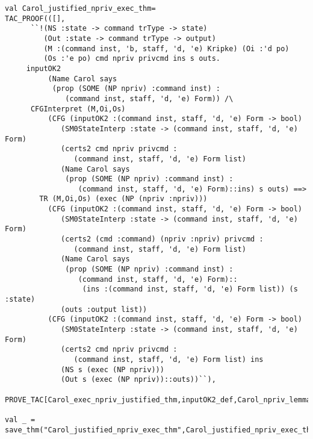 \documentclass{report}
\begin{document}
\begin{lstlisting}[frame=TBlr]
val Carol_justified_npriv_exec_thm=
TAC_PROOF(([],
      ``!(NS :state -> command trType -> state)
         (Out :state -> command trType -> output)
         (M :(command inst, 'b, staff, 'd, 'e) Kripke) (Oi :'d po)
         (Os :'e po) cmd npriv privcmd ins s outs.
	 inputOK2
          (Name Carol says
           (prop (SOME (NP npriv) :command inst) :
              (command inst, staff, 'd, 'e) Form)) /\
	  CFGInterpret (M,Oi,Os)
          (CFG (inputOK2 :(command inst, staff, 'd, 'e) Form -> bool)
             (SM0StateInterp :state -> (command inst, staff, 'd, 'e) Form)
             (certs2 cmd npriv privcmd :
                (command inst, staff, 'd, 'e) Form list)
             (Name Carol says
              (prop (SOME (NP npriv) :command inst) :
                 (command inst, staff, 'd, 'e) Form)::ins) s outs) ==>
        TR (M,Oi,Os) (exec (NP (npriv :npriv)))
          (CFG (inputOK2 :(command inst, staff, 'd, 'e) Form -> bool)
             (SM0StateInterp :state -> (command inst, staff, 'd, 'e) Form)
             (certs2 (cmd :command) (npriv :npriv) privcmd :
                (command inst, staff, 'd, 'e) Form list)
             (Name Carol says
              (prop (SOME (NP npriv) :command inst) :
                 (command inst, staff, 'd, 'e) Form)::
                  (ins :(command inst, staff, 'd, 'e) Form list)) (s :state)
             (outs :output list))
          (CFG (inputOK2 :(command inst, staff, 'd, 'e) Form -> bool)
             (SM0StateInterp :state -> (command inst, staff, 'd, 'e) Form)
             (certs2 cmd npriv privcmd :
                (command inst, staff, 'd, 'e) Form list) ins
             (NS s (exec (NP npriv)))
             (Out s (exec (NP npriv))::outs))``),
	     PROVE_TAC[Carol_exec_npriv_justified_thm,inputOK2_def,Carol_npriv_lemma])

val _ = save_thm("Carol_justified_npriv_exec_thm",Carol_justified_npriv_exec_thm)

\end{lstlisting}
\end{document}
